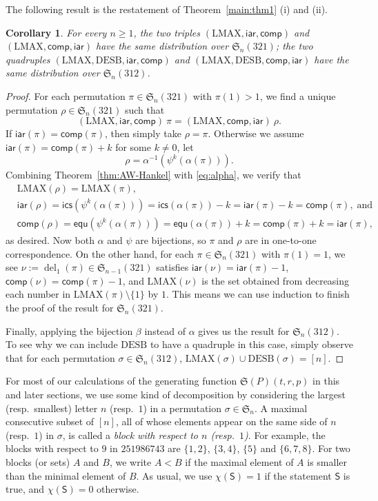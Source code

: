 \documentclass[12pt]{amsart}
\numberwithin{equation}{section}
\theoremstyle{plain}
\newtheorem{corollary}[theorem]{Corollary}
\theoremstyle{definition}
\def\S{\mathfrak{S}}
\def\iar{\mathsf{iar}}
\def\comp{\mathsf{comp}}
\def\LMAX{\mathrm{LMAX}}
\def\del{\operatorname{del}}
\def\ics{\mathsf{ics}}
\def\equ{\mathsf{equ}}
\def\DESB{\mathrm{DESB}}
\def\DESB{\mathrm{DESB}}
\begin{document}

The following result is the restatement of Theorem~\ref{main:thm1} (i) and (ii).
\begin{corollary}\label{cor:321-312-symmetry}
For every $n\ge 1$, the two triples $(\LMAX,\iar,\comp)$ and $(\LMAX,\comp,\iar)$ have the same distribution over $\S_n(321)$; the two quadruples $(\LMAX,\DESB,\iar,\comp)$ and $(\LMAX,\DESB,\comp,\iar)$ have the same distribution over $\S_n(312)$.
\end{corollary}

\begin{proof}
For each permutation $\pi\in\S_n(321)$ with $\pi(1)>1$, we find a unique permutation $\rho\in\S_n(321)$ such that $$(\LMAX,\iar,\comp)\:\pi = (\LMAX,\comp,\iar)\:\rho.$$ If $\iar(\pi)=\comp(\pi)$, then simply take $\rho=\pi$. Otherwise we assume $\iar(\pi)=\comp(\pi)+k$ for some $k\neq 0$, let $$\rho=\alpha^{-1}(\psi^k(\alpha(\pi))).$$
Combining Theorem~\ref{thm:AW-Hankel} with \eqref{eq:alpha}, we verify that
\begin{align*}
&\LMAX(\rho)=\LMAX(\pi),\\
&\iar(\rho)=\ics(\psi^k(\alpha(\pi)))=\ics(\alpha(\pi))-k=\iar(\pi)-k=\comp(\pi), \; \text{and}\\
&\comp(\rho)=\equ(\psi^k(\alpha(\pi)))=\equ(\alpha(\pi))+k=\comp(\pi)+k=\iar(\pi), 
\end{align*}
as desired. Now both $\alpha$ and $\psi$ are bijections, so $\pi$ and $\rho$ are in one-to-one correspondence. On the other hand, for each $\pi\in\S_n(321)$ with $\pi(1)=1$, we see $\nu:=\del_1(\pi)\in\S_{n-1}(321)$ satisfies $\iar(\nu)=\iar(\pi)-1$, $\comp(\nu)=\comp(\pi)-1$, and $\LMAX(\nu)$ is the set obtained from decreasing each number in $\LMAX(\pi)\setminus\{1\}$ by $1$. This means we can use induction to finish the proof of the result for $\S_n(321)$.

Finally, applying the bijection $\beta$ instead of $\alpha$ gives us the result for $\S_n(312)$. To see why we can include $\DESB$ to have a quadruple in this case, simply observe that for each permutation $\sigma\in\S_n(312)$, $\LMAX(\sigma)\cup\DESB(\sigma)=[n]$.
\end{proof}

For most of our calculations of the generating function $\S(P)(t,r,p)$ in this and later sections, we use some kind of decomposition by considering the largest (resp.~smallest) letter $n$ (resp.~$1$) in a permutation $\sigma\in\S_n$. A maximal consecutive subset of $[n]$, all of whose elements appear on the same side of $n$  (resp.~$1$) in $\sigma$, is called a {\em block with respect to $n$ (resp.~$1$)}. For example, the blocks with respect to $9$ in $251986743$ are $\{1,2\}$, $\{3, 4\}$, $\{5\}$ and $\{6, 7, 8\}$. For two blocks (or sets) $A$ and $B$, we write $A<B$ if the maximal element of $A$ is smaller than the minimal element of $B$. As usual, we use $\chi(\mathsf{S})=1$ if the statement $\mathsf{S}$ is true, and $\chi(\mathsf{S})=0$ otherwise.
\end{document}
